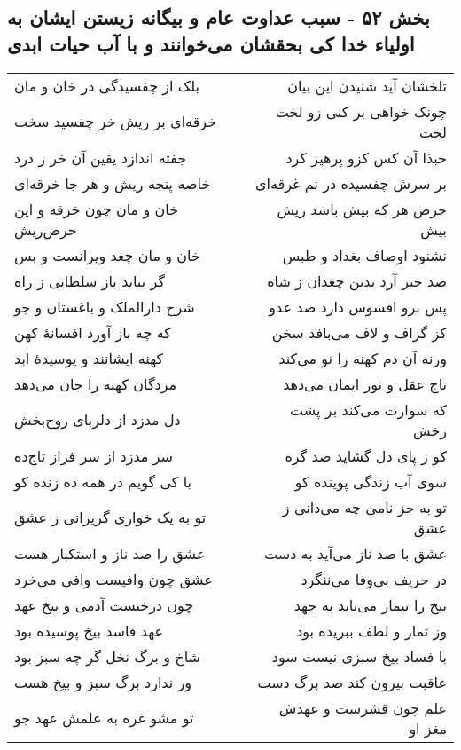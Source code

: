 \begin{center}
\section*{بخش ۵۲ - سبب عداوت عام و بیگانه زیستن ایشان به اولیاء خدا کی بحقشان می‌خوانند و با آب حیات ابدی}
\label{sec:sh052}
\begin{longtable}{l p{0.5cm} r}
بلک از چفسیدگی در خان و مان
&&
تلخشان آید شنیدن این بیان
\\
خرقه‌ای بر ریش خر چفسید سخت
&&
چونک خواهی بر کنی زو لخت لخت
\\
جفته اندازد یقین آن خر ز درد
&&
حبذا آن کس کزو پرهیز کرد
\\
خاصه پنجه ریش و هر جا خرقه‌ای
&&
بر سرش چفسیده در نم غرقه‌ای
\\
خان و مان چون خرقه و این حرص‌ریش
&&
حرص هر که بیش باشد ریش بیش
\\
خان و مان چغد ویرانست و بس
&&
نشنود اوصاف بغداد و طبس
\\
گر بیاید باز سلطانی ز راه
&&
صد خبر آرد بدین چغدان ز شاه
\\
شرح دارالملک و باغستان و جو
&&
پس برو افسوس دارد صد عدو
\\
که چه باز آورد افسانهٔ کهن
&&
کز گزاف و لاف می‌بافد سخن
\\
کهنه ایشانند و پوسیدهٔ ابد
&&
ورنه آن دم کهنه را نو می‌کند
\\
مردگان کهنه را جان می‌دهد
&&
تاج عقل و نور ایمان می‌دهد
\\
دل مدزد از دلربای روح‌بخش
&&
که سوارت می‌کند بر پشت رخش
\\
سر مدزد از سر فراز تاج‌ده
&&
کو ز پای دل گشاید صد گره
\\
با کی گویم در همه ده زنده کو
&&
سوی آب زندگی پوینده کو
\\
تو به یک خواری گریزانی ز عشق
&&
تو به جز نامی چه می‌دانی ز عشق
\\
عشق را صد ناز و استکبار هست
&&
عشق با صد ناز می‌آید به دست
\\
عشق چون وافیست وافی می‌خرد
&&
در حریف بی‌وفا می‌ننگرد
\\
چون درختست آدمی و بیخ عهد
&&
بیخ را تیمار می‌باید به جهد
\\
عهد فاسد بیخ پوسیده بود
&&
وز ثمار و لطف ببریده بود
\\
شاخ و برگ نخل گر چه سبز بود
&&
با فساد بیخ سبزی نیست سود
\\
ور ندارد برگ سبز و بیخ هست
&&
عاقبت بیرون کند صد برگ دست
\\
تو مشو غره به علمش عهد جو
&&
علم چون قشرست و عهدش مغز او
\\
\end{longtable}
\end{center}
